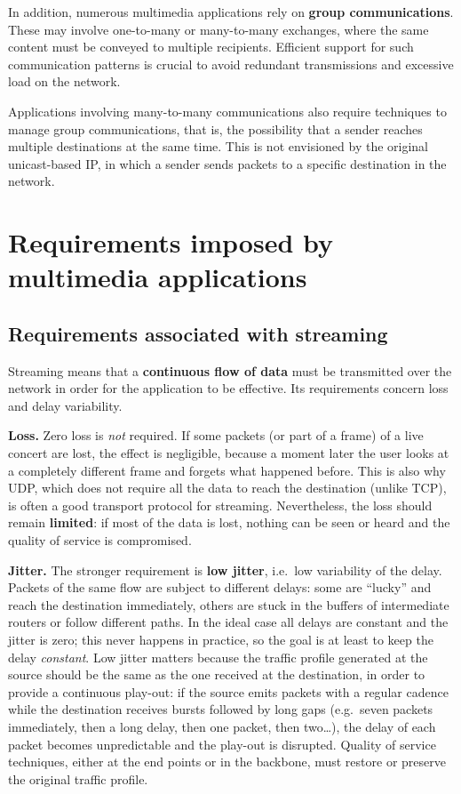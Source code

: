 In addition, numerous multimedia applications rely on \textbf{group communications}. These may involve one-to-many or many-to-many exchanges, where the same content must be conveyed to multiple recipients. Efficient support for such communication patterns is crucial to avoid redundant transmissions and excessive load on the network.

Applications involving many-to-many communications also require techniques to manage group communications, that is, the possibility that a sender reaches multiple destinations at the same time. This is not envisioned by the original unicast-based IP, in which a sender sends packets to a specific destination in the network.

\section{Requirements imposed by multimedia applications}

\subsection{Requirements associated with streaming}

Streaming means that a \textbf{continuous flow of data} must be transmitted over the network in order for the application to be effective. Its requirements concern loss and delay variability.

\textbf{Loss.} Zero loss is \emph{not} required. If some packets (or part of a frame) of a live concert are lost, the effect is negligible, because a moment later the user looks at a completely different frame and forgets what happened before. This is also why UDP, which does not require all the data to reach the destination (unlike TCP), is often a good transport protocol for streaming. Nevertheless, the loss should remain \textbf{limited}: if most of the data is lost, nothing can be seen or heard and the quality of service is compromised.

\textbf{Jitter.} The stronger requirement is \textbf{low jitter}, i.e.\ low variability of the delay. Packets of the same flow are subject to different delays: some are ``lucky'' and reach the destination immediately, others are stuck in the buffers of intermediate routers or follow different paths. In the ideal case all delays are constant and the jitter is zero; this never happens in practice, so the goal is at least to keep the delay \emph{constant}. Low jitter matters because the traffic profile generated at the source should be the same as the one received at the destination, in order to provide a continuous play-out: if the source emits packets with a regular cadence while the destination receives bursts followed by long gaps (e.g.\ seven packets immediately, then a long delay, then one packet, then two\ldots), the delay of each packet becomes unpredictable and the play-out is disrupted. Quality of service techniques, either at the end points or in the backbone, must restore or preserve the original traffic profile.

